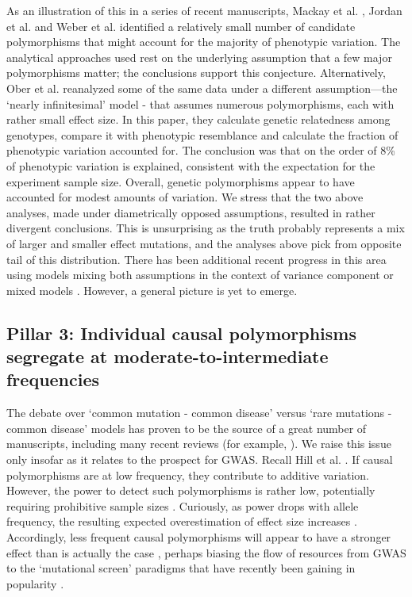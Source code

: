 As an illustration of this in a series of recent manuscripts, Mackay et al. \cite{Mackay2012}, Jordan et al. \cite{Jordan2012} and Weber et al. \cite{Weber2012} identified a relatively small number of candidate polymorphisms that might account for the majority of phenotypic variation. The analytical approaches used rest on the underlying assumption that a few major polymorphisms matter; the conclusions support this conjecture. Alternatively, Ober et al. \cite{Ober2012} reanalyzed some of the same data under a different assumption—the `nearly infinitesimal' model - that assumes numerous polymorphisms, each with rather small effect size. In this paper, they calculate genetic relatedness among genotypes, compare it with phenotypic resemblance and calculate the fraction of phenotypic variation accounted for. The conclusion was that on the order of 8\% of phenotypic variation is explained, consistent with the expectation for the experiment sample size. Overall, genetic polymorphisms appear to have accounted for modest amounts of variation. We stress that the two above analyses, made under diametrically opposed assumptions, resulted in rather divergent conclusions. This is unsurprising as the truth probably represents a mix of larger and smaller effect mutations, and the analyses above pick from opposite tail of this distribution. There has been additional recent progress in this area using models mixing both assumptions in the context of variance component or mixed models \cite{Kang2010, Korte2012}. However, a general picture is yet to emerge.

\subsection{Pillar 3: Individual causal polymorphisms segregate at moderate-to-intermediate frequencies}

The debate over `common mutation - common disease' versus `rare mutations - common disease' models has proven to be the source of a great number of manuscripts, including many recent reviews (for example, \cite{Manolio2009}). We raise this issue only insofar as it relates to the prospect for GWAS. Recall Hill et al. \cite{Hill2008}. If causal polymorphisms are at low frequency, they contribute to additive variation. However, the power to detect such polymorphisms is rather low, potentially requiring prohibitive sample sizes \cite{Zuk2012}. Curiously, as power drops with allele frequency, the resulting expected overestimation of effect size increases \cite{Lynch1998}. Accordingly, less frequent causal polymorphisms will appear to have a stronger effect than is actually the case \cite{Mackay2012}, perhaps biasing the flow of resources from GWAS to the `mutational screen' paradigms that have recently been gaining in popularity \cite{Tennessen2012}.

